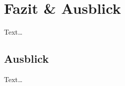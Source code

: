 \chapter{Fazit \& Ausblick}
\label{ch:fazit}

Text\dots

\section*{Ausblick}
\label{sec:ausblick}

Text\dots
